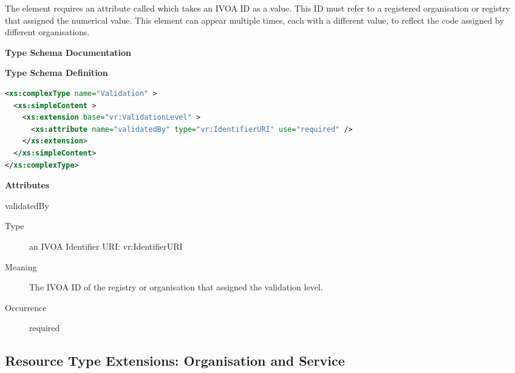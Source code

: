 \documentclass[11pt,a4paper]{ivoa}
\begin{document}
The  element requires an attribute called
 which takes an IVOA ID as a value.  This ID
must refer to a registered organisation or registry that assigned the
numerical value.  This element can appear multiple times, each with
a different  value, to reflect the code
assigned by different organisations. 


\begingroup
      	\renewcommand*\descriptionlabel[1]{%
      	\hbox to 5.5em{\emph{#1}\hfil}}\vspace{2ex}\noindent\textbf{ Type Schema Documentation}


\vspace{1ex}\noindent\textbf{ Type Schema Definition}

\begin{lstlisting}[language=XML,basicstyle=\footnotesize]
<xs:complexType name="Validation" >
  <xs:simpleContent >
    <xs:extension base="vr:ValidationLevel" >
      <xs:attribute name="validatedBy" type="vr:IdentifierURI" use="required" />
    </xs:extension>
  </xs:simpleContent>
</xs:complexType>
\end{lstlisting}

\vspace{0.5ex}\noindent\textbf{ Attributes}

\begingroup\small\begin{bigdescription}
\item[validatedBy]
\begin{description}
\item[Type] an IVOA Identifier URI: vr:IdentifierURI
\item[Meaning] 
               The IVOA ID of the registry or organisation that
               assigned the validation level.  
             
\item[Occurrence] required

\end{description}


\end{bigdescription}\endgroup

\endgroup

\subsection{Resource Type Extensions:  Organisation and Service}
\end{document}
